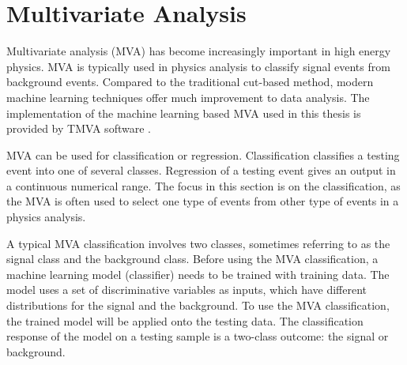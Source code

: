 \section{Multivariate Analysis}
\label{sec:pandoraMVA}

Multivariate analysis (MVA) has become increasingly important in high energy physics. MVA is typically used in physics analysis to classify signal events from background events. Compared to the traditional cut-based method, modern machine learning techniques offer much improvement to data analysis. The implementation of the machine learning based MVA used in this thesis is provided by  TMVA software \cite{Hocker:2007ht}.


MVA can be used for classification or regression. Classification classifies a testing event into one of several classes. Regression of a testing event  gives an output in a continuous numerical range. The focus in this section is on the classification, as the MVA is often used to select one type of events from other type of events in a physics analysis.

A typical MVA classification involves two classes, sometimes referring to as the signal class and the background class. Before using the MVA classification, a machine learning model (classifier) needs to be trained with training data. The model uses a set of discriminative variables as inputs, which have different distributions for the signal and the background. To use the MVA classification, the trained model will be applied onto the testing data. The classification response of the model on a testing sample is a two-class outcome:  the signal or background.

